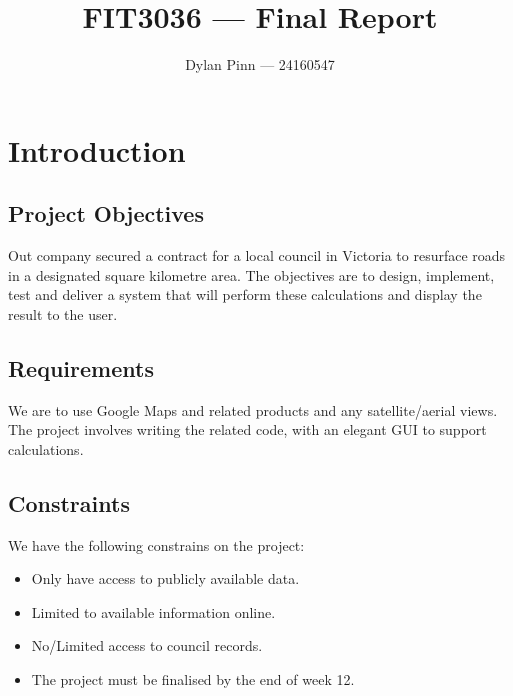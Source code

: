 \documentclass[a4paper,11pt]{article}
\begin{document}
\title{FIT3036 --- Final Report}
\author{Dylan Pinn --- 24160547}
\maketitle
\pagebreak

\tableofcontents
\pagebreak

\section{Introduction}

\subsection{Project Objectives}

Out company secured a contract for a local council in Victoria to resurface
roads in a designated square kilometre area. The objectives are to design,
implement, test and deliver a system that will perform these calculations and
display the result to the user.

\subsection{Requirements}

We are to use Google Maps and related products and any satellite/aerial views.
The project involves writing the related code, with an elegant GUI to support
calculations. \autocite[2]{intro:1}

\subsection{Constraints}

We have the following constrains on the project:

\begin{itemize}
  \item Only have access to publicly available data.
  \item Limited to available information online.
  \item No/Limited access to council records.
  \item The project must be finalised by the end of week 12.
\end{itemize}
\end{document}
